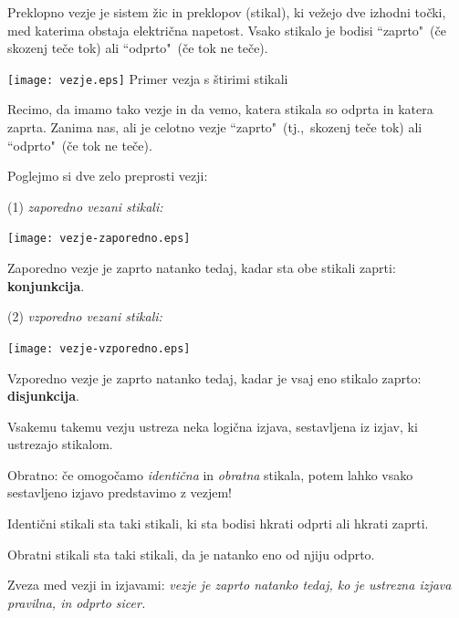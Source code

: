 \documentclass[11pt,paper=b5,footinclude,headinclude]{scrbook} %
\begin{document}
Preklopno vezje je sistem žic in preklopov (stikal), ki vežejo dve
izhodni točki, med katerima obstaja električna napetost.
Vsako stikalo je bodisi ``zaprto"~(če skozenj teče tok) ali
``odprto"~(če tok ne teče).

\begin{center}
\texttt{[image: vezje.eps]}
{Primer vezja s štirimi stikali}
\end{center}

Recimo, da imamo tako vezje in da vemo, katera stikala so odprta in katera zaprta.
Zanima nas, ali je celotno vezje ``zaprto"~(tj.,~skozenj teče tok) ali ``odprto"~(če
tok ne teče).


Poglejmo si dve zelo preprosti vezji:

(1) {\em zaporedno vezani stikali:}
\begin{center}
\texttt{[image: vezje-zaporedno.eps]}
\end{center}

Zaporedno vezje je zaprto natanko tedaj, kadar sta obe stikali zaprti: \textbf{ konjunkcija}.

(2) {\em vzporedno vezani stikali:}

\begin{center}
\texttt{[image: vezje-vzporedno.eps]}
\end{center}

Vzporedno vezje je zaprto natanko tedaj, kadar je vsaj eno stikalo zaprto:
\textbf{ disjunkcija}.

\medskip
Vsakemu takemu vezju ustreza neka logična izjava, sestavljena iz izjav, ki ustrezajo stikalom.

\medskip
Obratno: če omogočamo {\em identična} in {\em obratna} stikala, potem lahko
vsako sestavljeno izjavo predstavimo z vezjem!

Identični stikali sta taki stikali, ki sta bodisi hkrati odprti ali hkrati zaprti.

Obratni stikali sta taki stikali, da je natanko eno od njiju odprto.

\medskip
Zveza med vezji in izjavami:
{\em vezje je zaprto natanko tedaj, ko je ustrezna izjava pravilna, in odprto sicer.}
\end{document}
